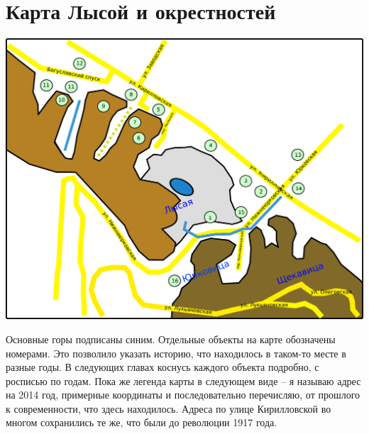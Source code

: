 \chapter{Карта Лысой и окрестностей}

\begin{center}
\includegraphics[width=\linewidth]{chast-kirvys/karta/y-main.pdf}
\end{center}

Основные горы подписаны синим. Отдельные объекты на карте обозначены номерами. Это позволило указать историю, что находилось в таком-то месте в разные годы. В следующих главах коснусь каждого объекта подробно, с росписью по годам. Пока же легенда карты в следующем виде – я называю адрес на 2014 год, примерные координаты и последовательно перечисляю, от прошлого к современности, что здесь находилось. Адреса по улице Кирилловской во многом сохранились те же, что были до революции 1917 года.

